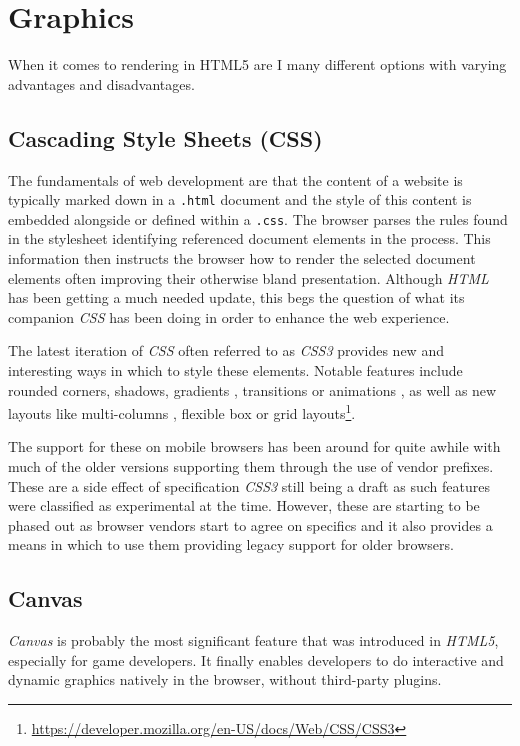 \documentclass[final]{cmpreport}
\begin{document}
\section{Graphics}
When it comes to rendering in HTML5 are I many different options with varying advantages and disadvantages.

\subsection{Cascading Style Sheets (CSS)}
The fundamentals of web development are that the content of a website is typically marked down in a \texttt{.html} document and the style of this content is embedded alongside or defined within a \texttt{.css}. The browser parses the rules found in the stylesheet identifying referenced document elements in the process. This information then instructs the browser how to render the selected document elements often improving their otherwise bland presentation. Although \textit{HTML} has been getting a much needed update, this begs the question of what its companion \textit{CSS} has been doing in order to enhance the web experience. 

The latest iteration of \textit{CSS} often referred to as \textit{CSS3} provides new and interesting ways in which to style these elements. Notable features include rounded corners, shadows, gradients , transitions or animations , as well as new layouts like multi-columns , flexible box or grid layouts\footnote{\url{https://developer.mozilla.org/en-US/docs/Web/CSS/CSS3}}.

The support for these on mobile browsers has been around for quite awhile with much of the older versions supporting them through the use of vendor prefixes. These are a side effect of specification \textit{CSS3} still being a draft as such features were classified as experimental at the time. However, these are starting to be phased out as browser vendors start to agree on specifics and it also provides a means in which to use them providing legacy support for older browsers.

\subsection{Canvas}
\textit{Canvas} is probably the most significant feature that was introduced in \textit{HTML5}, especially for game developers. It finally enables developers to do interactive and dynamic graphics natively in the browser, without third-party plugins.
\end{document}
